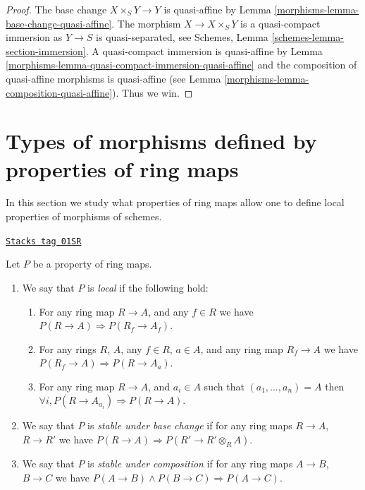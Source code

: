 \begin{proof}

The base change $X \times_S Y \to Y$ is quasi-affine by
Lemma \ref{morphisms-lemma-base-change-quasi-affine}.
The morphism $X \to X \times_S Y$ is
a quasi-compact immersion as $Y \to S$ is quasi-separated, see
Schemes, Lemma \ref{schemes-lemma-section-immersion}.
A quasi-compact immersion is quasi-affine by
Lemma \ref{morphisms-lemma-quasi-compact-immersion-quasi-affine}
and the composition of quasi-affine morphisms is quasi-affine
(see Lemma \ref{morphisms-lemma-composition-quasi-affine}). Thus we win.
\end{proof}

\section{Types of morphisms defined by properties of ring maps}
\label{morphisms-section-properties-ring-maps}
In this section we study what properties of ring maps
allow one to define local properties of morphisms of schemes.

\begin{definition}
\label{morphisms-definition-property-local}
\href{https://stacks.math.columbia.edu/tag/01SR}{\texttt{Stacks tag 01SR}}

Let $P$ be a property of ring maps.
\begin{enumerate}
\item We say that $P$ is {\it local} if the following hold:
\begin{enumerate}
\item For any ring map $R \to A$, and any $f \in R$ we have
$P(R \to A) \Rightarrow P(R_f \to A_f)$.
\item For any rings $R$, $A$, any $f \in R$, $a\in A$, and any ring map
$R_f \to A$ we have $P(R_f \to A) \Rightarrow P(R \to A_a)$.
\item For any ring map $R \to A$, and $a_i \in A$ such that
$(a_1, \ldots, a_n) = A$ then
$\forall i, P(R \to A_{a_i}) \Rightarrow P(R \to A)$.
\end{enumerate}
\item We say that $P$ is {\it stable under base change} if for any
ring maps $R \to A$, $R \to R'$ we have
$P(R \to A) \Rightarrow P(R' \to R' \otimes_R A)$.
\item We say that $P$ is {\it stable under composition} if for any
ring maps $A \to B$, $B \to C$ we have
$P(A \to B) \wedge P(B \to C) \Rightarrow P(A \to C)$.
\end{enumerate}
\end{definition}

